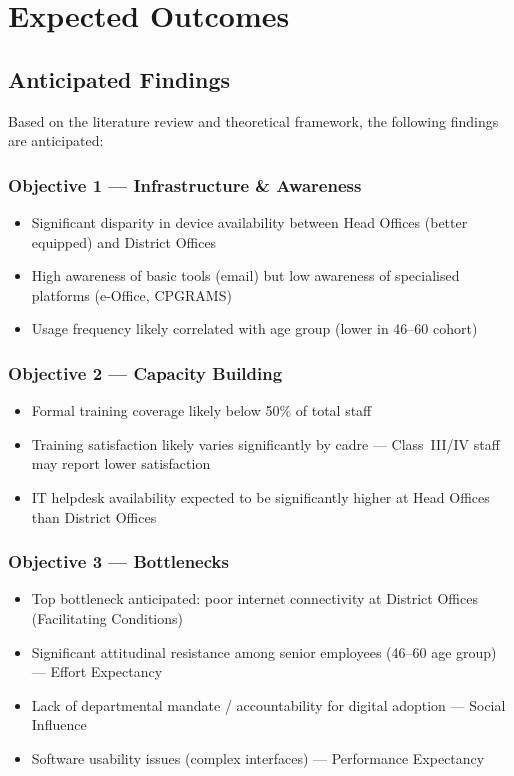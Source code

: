 \documentclass[12pt,a4paper]{article}
\begin{document}
\section{Expected Outcomes}

\subsection{Anticipated Findings}

Based on the literature review and theoretical framework, the following findings are anticipated:

\subsubsection*{\color{accentblue}Objective 1 --- Infrastructure \& Awareness}
\begin{itemize}[leftmargin=1.5em, itemsep=2pt]
    \item Significant disparity in device availability between Head Offices (better equipped) and District Offices
    \item High awareness of basic tools (email) but low awareness of specialised platforms (e-Office, CPGRAMS)
    \item Usage frequency likely correlated with age group (lower in 46--60 cohort)
\end{itemize}

\subsubsection*{\color{accentgreen}Objective 2 --- Capacity Building}
\begin{itemize}[leftmargin=1.5em, itemsep=2pt]
    \item Formal training coverage likely below 50\% of total staff
    \item Training satisfaction likely varies significantly by cadre --- Class~III/IV staff may report lower satisfaction
    \item IT helpdesk availability expected to be significantly higher at Head Offices than District Offices
\end{itemize}

\subsubsection*{\color{accentorange}Objective 3 --- Bottlenecks}
\begin{itemize}[leftmargin=1.5em, itemsep=2pt]
    \item Top bottleneck anticipated: poor internet connectivity at District Offices (Facilitating Conditions)
    \item Significant attitudinal resistance among senior employees (46--60 age group) --- Effort Expectancy
    \item Lack of departmental mandate / accountability for digital adoption --- Social Influence
    \item Software usability issues (complex interfaces) --- Performance Expectancy
\end{itemize}
\end{document}
